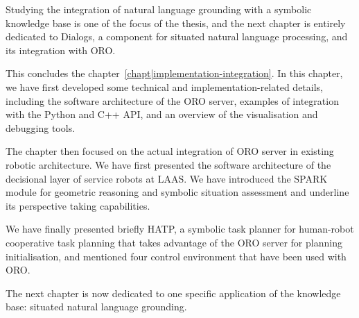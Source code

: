 Studying the integration of natural language grounding with a symbolic
knowledge base is one of the focus of the thesis, and the next chapter is
entirely dedicated to {\sc Dialogs}, a component for situated natural language
processing, and its integration with ORO.


\recap

This concludes the chapter~\ref{chapt|implementation-integration}. In this
chapter, we have first developed some technical and implementation-related
details, including the software architecture of the ORO server, examples of
integration with the Python and C++ API, and an overview of the visualisation
and debugging tools.

The chapter then focused on the actual integration of ORO server in existing
robotic architecture. We have first presented the software architecture of the
decisional layer of service robots at LAAS. We have introduced the SPARK module
for geometric reasoning and symbolic situation assessment and underline its
perspective taking capabilities.

We have finally presented briefly HATP, a symbolic task planner for human-robot
cooperative task planning that takes advantage of the ORO server for planning
initialisation, and mentioned four control environment that have been used with
ORO.

The next chapter is now dedicated to one specific application of the knowledge
base: situated natural language grounding.


